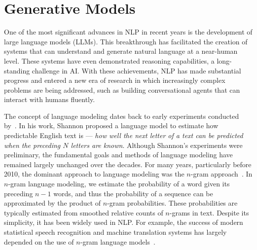 
%




\chapter{Generative Models}

\thispagestyle{chapterurl} %

\noindent One of the most significant advances in NLP in recent years is the development of large language models (LLMs). This breakthrough has facilitated the creation of systems that can understand and generate natural language at a near-human level. These systems have even demonstrated reasoning capabilities, a long-standing challenge in AI. With these achievements, NLP has made substantial progress and entered a new era of research in which increasingly complex problems are being addressed, such as building conversational agents that can interact with humans fluently.

The concept of language modeling dates back to early experiments conducted by~\citet{shannon:1951prediction}. In his work, Shannon proposed a language model to estimate how predictable English text is --- \textit{how well the next letter of a text can be predicted when the preceding $N$ letters are known}. Although Shannon's experiments were preliminary, the fundamental goals and methods of language modeling have remained largely unchanged over the decades. For many years, particularly before 2010, the dominant approach to language modeling was the $n$-gram approach~\cite{Jurafsky-and-Martin:2008}. In $n$-gram language modeling, we estimate the probability of a word given its preceding $n-1$ words, and thus the probability of a sequence can be approximated by the product of $n$-gram probabilities. These probabilities are typically estimated from smoothed relative counts of $n$-grams in text. Despite its simplicity, it has been widely used in NLP. For example, the success of modern statistical speech recognition and machine translation systems has largely depended on the use of $n$-gram language models~\cite{jelinek:1998statistical,Koehn:2010}.

